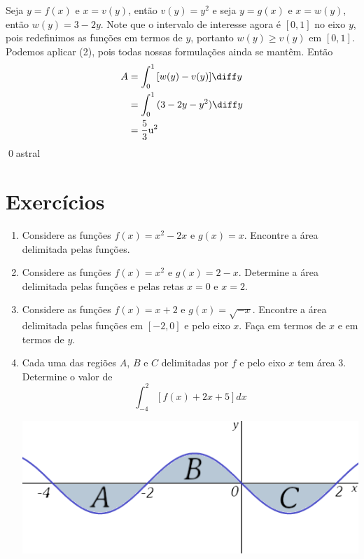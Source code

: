 \documentclass[a4paper, 12pt]{extreport}
\begin{document}
      \vspace{5mm}

      \noindent Seja $y = f(x)$ e $x = v(y)$, então $v(y) = y^2$ e seja $y = g(x)$ e $x = w(y)$, então $w(y) = 3 - 2y$. Note que o intervalo de interesse agora
      é $[0, 1]$ no eixo $y$, pois redefinimos as funções em termos de $y$, portanto $w(y) \geqslant v(y)$ em $[0, 1]$.
      Podemos aplicar (2), pois todas nossas formulações ainda se mantêm. Então
      \begin{equation*}
        \begin{split}
          A & = \int_0^1{[w(y)-v(y)]\diff y} \\
            & = \int_0^1{(3-2y-y^2)\diff y} \\
            & = \frac{5}{3}\mathrm{u^2}
        \end{split}
      \end{equation*}
      \qed{astral}

    \section{Exercícios}
      \begin{enumerate}
        \item Considere as funções $f(x) = x^2-2x$ e $g(x) = x$. Encontre a área delimitada pelas funções.
        \item Considere as funções $f(x) = x^2$ e $g(x) = 2-x$. Determine a área delimitada pelas funções e pelas retas $x = 0$ e $x = 2$.
        \item Considere as funções $f(x) = x+2$ e $g(x) = \sqrt{-x}$. Encontre a área delimitada pelas funções em $[-2, 0]$ e pelo eixo $x$.
          Faça em termos de $x$ e em termos de $y$.
        \item Cada uma das regiões $A$, $B$ e $C$ delimitadas por $f$ e pelo eixo $x$ tem área 3. Determine o valor de
          $$ \int_{-4}^2{[f(x)+2x+5]dx} $$
        \begin{center}
          \includegraphics[scale=0.35]{ex4}
        \end{center}
      \end{enumerate}
\end{document}

